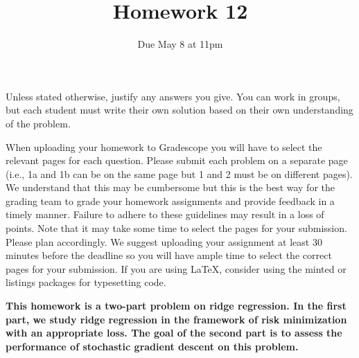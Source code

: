 \documentclass[12pt]{article}
\begin{document}
\title{\sc Homework 12}
\date{Due May 8 at 11pm} 
\author{}
\maketitle




\newtheorem*{problem}{Problem}
\newtheorem*{heuristic}{Heuristic}
\newtheorem*{conjecture}{Conjecture}
\newtheorem{theorem}{Theorem}[section]
\newtheorem{corollary}[theorem]{Corollary}
\newtheorem{prop}[theorem]{Proposition}
\newtheorem{lemma}[theorem]{Lemma}
\newtheorem{definition}[theorem]{Definition}
\theoremstyle{remark}
\newtheorem{example}[theorem]{Example}
\newtheorem{remark}[theorem]{Remark}
\newtheorem{exercise}[theorem]{Exercise}


Unless stated otherwise, justify any answers you give. You can work in groups, but each student
must write their own solution based on their own understanding of the problem.

When uploading your homework to Gradescope you will have to select the relevant pages
for each question. Please submit each problem on a separate page (i.e., 1a and 1b can be on
the same page but 1 and 2 must be on different pages). We understand that this may be
cumbersome but this is the best way for the grading team to grade your homework assignments and provide feedback in a timely manner. Failure to adhere to these guidelines may
result in a loss of points. Note that it may take some time to select the pages for your submission. Please plan accordingly. We suggest uploading your assignment at least 30 minutes
before the deadline so you will have ample time to select the correct pages for your submission. If you are using \LaTeX, consider using the minted or listings packages for typesetting code.

\medskip

\textbf{This homework is a two-part problem on ridge regression. In the first part, we study ridge regression in the framework of risk minimization with an appropriate loss. The goal of the second part is to assess the performance of stochastic gradient descent on this problem.}
\end{document}

